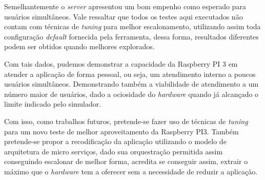 \documentclass[12pt,english,brazil]{article}
\begin{document}
Semelhantemente o \emph{server} apresentou um bom empenho como esperado para usuários simultâneos. Vale ressaltar que todos os testes aqui executados não contam com técnicas de \emph{tuning} para melhor escalonamento, utilizando assim toda configuração \emph{default} fornecida pela ferramenta, dessa forma, resultados diferentes podem ser obtidos quando melhores explorados.

Com tais dados, pudemos demonstrar a capacidade da Raspberry PI 3 em atender a aplicação de forma pessoal, ou seja, um atendimento interno a poucos usuários simultâneos. Demonstrando também a viabilidade de atendimento a um número maior de usuários, dado a ociosidade do \emph{hardware} quando já alcançado o limite indicado pelo simulador.

Com isso, como trabalhos futuros, pretende-se fazer uso de técnicas de \emph{tuning} para um novo teste de melhor aproveitamento da Raspberry PI3. Também pretende-se propor a recodificação da aplicação utilizando o modelo de arquitetura de micro serviços, dado sua orquestração permitida assim conseguindo escalonar de melhor forma, acredita se conseguir assim, extrair o máximo que o \emph{hardware} tem a oferecer sem a necessidade de reduzir a aplicação. 




\end{document}
